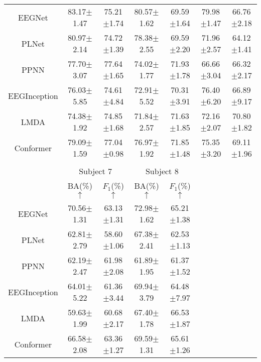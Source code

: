 \documentclass[preprint,12pt,authoryear]{elsarticle}
\begin{document}
\begin{table}[H]
\begin{tabular}{ccccccc}
EEGNet & 83.17$\pm$1.47 & 75.21$\pm$1.74 & 80.57$\pm$1.62 & 69.59$\pm$1.64 & 79.98$\pm$1.47 & 66.76$\pm$2.18 \\
PLNet & 80.97$\pm$2.14 & 74.72$\pm$1.39 & 78.38$\pm$2.55 & 69.59$\pm$2.20 & 71.96$\pm$2.57 & 64.12$\pm$1.41 \\
PPNN & 77.70$\pm$3.07 & 77.64$\pm$1.65 & 74.02$\pm$1.77 & 71.93$\pm$1.78 & 66.66$\pm$3.04 & 66.32$\pm$2.17 \\
EEGInception & 76.03$\pm$5.85 & 74.61$\pm$4.84 & 72.91$\pm$5.52 & 70.31$\pm$3.91 & 76.40$\pm$6.20 & 66.89$\pm$9.17 \\
LMDA & 74.38$\pm$1.92 & 74.85$\pm$1.68 & 71.84$\pm$2.57 & 71.63$\pm$1.85 & 72.16$\pm$2.07 & 70.80$\pm$1.82 \\
Conformer & 79.09$\pm$1.59 & 77.04$\pm$0.98 & 76.97$\pm$1.92 & 71.85$\pm$1.48 & 75.35$\pm$3.20 & 69.11$\pm$1.96 \\
\\
\toprule
 & \multicolumn{2}{c}{Subject 7} & \multicolumn{2}{c}{Subject 8} \\
\cmidrule{2-3}\cmidrule{4-5}
& BA(\%) $\uparrow$ & $F_1$(\%) $\uparrow$ & BA(\%) $\uparrow$ & $F_1$(\%) $\uparrow$ \\ \cmidrule{1-5}
EEGNet & 70.56$\pm$1.31 & 63.13$\pm$1.31 & 72.98$\pm$1.62 & 65.21$\pm$1.38 \\
PLNet & 62.81$\pm$2.79 & 58.60$\pm$1.06 & 67.38$\pm$2.41 & 62.53$\pm$1.13 \\
PPNN & 62.19$\pm$2.47 & 61.98$\pm$2.08 & 61.89$\pm$1.95 & 61.37$\pm$1.52 \\
EEGInception & 64.01$\pm$5.22 & 61.36$\pm$3.44 & 69.94$\pm$3.79 & 64.48$\pm$7.97 \\
LMDA & 59.63$\pm$1.99 & 60.68$\pm$2.17 & 67.40$\pm$1.78 & 66.53$\pm$1.87 \\
Conformer & 66.58$\pm$2.08 & 63.36$\pm$1.27 & 69.59$\pm$1.31 & 65.61$\pm$1.26 \\
\bottomrule
\end{tabular}
\end{table}
\end{document}
